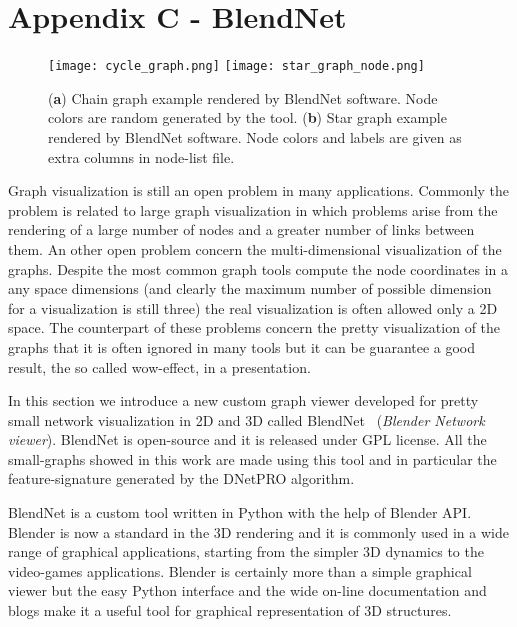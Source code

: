 \documentclass{standalone}
\begin{document}
\chapter*{Appendix C - BlendNet}

\begin{figure}[htbp]
\centering
\texttt{[image: cycle\_graph.png]}
\qquad\qquad
\texttt{[image: star\_graph\_node.png]}
\caption{(\textbf{a}) Chain graph example rendered by BlendNet software.
Node colors are random generated by the tool.
(\textbf{b}) Star graph example rendered by BlendNet software.
Node colors and labels are given as extra columns in node-list file.
}
\label{fig:blendnet}
\end{figure}

Graph visualization is still an open problem in many applications.
Commonly the problem is related to large graph visualization in which problems arise from the rendering of a large number of nodes and a greater number of links between them.
An other open problem concern the multi-dimensional visualization of the graphs.
Despite the most common graph tools compute the node coordinates in a any space dimensions (and clearly the maximum number of possible dimension for a visualization is still three) the real visualization is often allowed only a 2D space.
The counterpart of these problems concern the pretty visualization of the graphs that it is often ignored in many tools but it can be guarantee a good result, the so called wow-effect, in a presentation.

In this section we introduce a new custom graph viewer developed for pretty small network visualization in 2D and 3D called \textsf{BlendNet}~\cite{BlendNet} (\emph{Blender Network viewer}).
BlendNet is open-source and it is released under GPL license.
All the small-graphs showed in this work are made using this tool and in particular the feature-signature generated by the DNetPRO algorithm.

BlendNet is a custom tool written in Python with the help of Blender API.
Blender is now a standard in the 3D rendering and it is commonly used in a wide range of graphical applications, starting from the simpler 3D dynamics to the video-games applications.
Blender is certainly more than a simple graphical viewer but the easy Python interface and the wide on-line documentation and blogs make it a useful tool for graphical representation of 3D structures.
\end{document}
